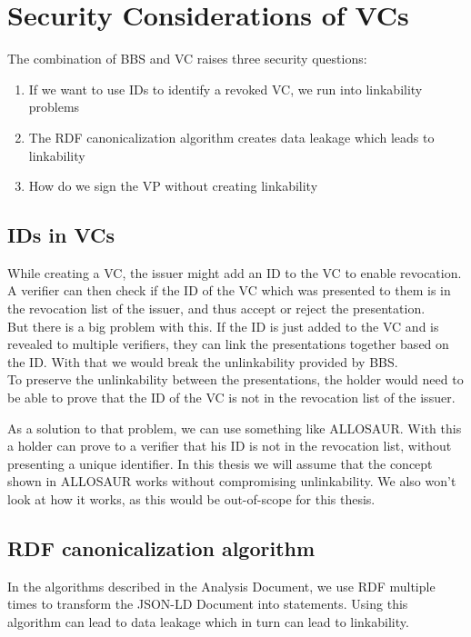 \documentclass[
	a4paper               %
	,BCOR=0mm            %
	,bibliography=totoc   %
	,listof=totoc         %
	,monolingual
	,twoside=false
]{bfhthesis}              %
\begin{document}
\section{Security Considerations of VCs}
\label{subsec:vcseccons}
The combination of BBS and VC raises three security questions:
\begin{enumerate}
	\item If we want to use IDs to identify a revoked VC, we run into linkability problems
	\item The RDF canonicalization algorithm creates data leakage which leads to linkability
	\item How do we sign the VP without creating linkability
\end{enumerate}

\subsection{IDs in VCs}
While creating a VC, the issuer might add an ID to the VC to enable revocation.
A verifier can then check if the ID of the VC which was presented to them is in the revocation list of the issuer, and thus accept or reject the presentation.\\
But there is a big problem with this.
If the ID is just added to the VC and is revealed to multiple verifiers, they can link the presentations together based on the ID.
With that we would break the unlinkability provided by BBS.\\

To preserve the unlinkability between the presentations, the holder would need to be able to prove that the ID of the VC is not in the revocation list of the issuer.

As a solution to that problem, we can use something like ALLOSAUR\cite{allosaur}. 
With this a holder can prove to a verifier that his ID is not in the revocation list, without presenting a unique identifier.
In this thesis we will assume that the concept shown in ALLOSAUR works without compromising unlinkability.
We also won't look at how it works, as this would be out-of-scope for this thesis.

\subsection{RDF canonicalization algorithm}
In the algorithms described in the Analysis Document, we use RDF multiple times to transform the JSON-LD Document into statements.
Using this algorithm can lead to data leakage which in turn can lead to linkability.
\end{document}
